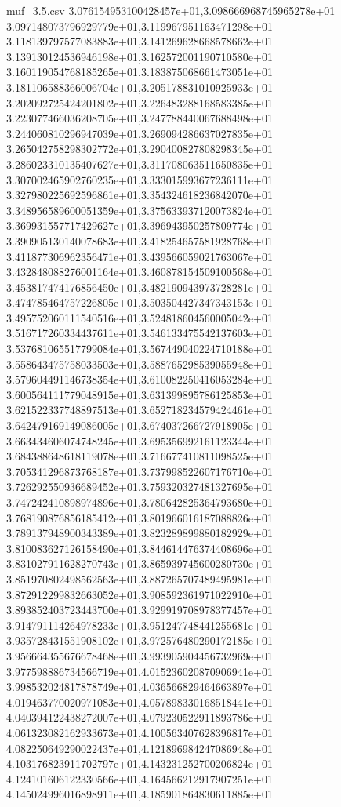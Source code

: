 \begin{filecontents*}{muf_3.5.csv}
3.076154953100428457e+01,3.098666968745965278e+01
3.097148073796929779e+01,3.119967951163471298e+01
3.118139797577083883e+01,3.141269628668578662e+01
3.139130124536946198e+01,3.162572001190710580e+01
3.160119054768185265e+01,3.183875068661473051e+01
3.181106588366006704e+01,3.205178831010925933e+01
3.202092725424201802e+01,3.226483288168583385e+01
3.223077466036208705e+01,3.247788440067688498e+01
3.244060810296947039e+01,3.269094286637027835e+01
3.265042758298302772e+01,3.290400827808298345e+01
3.286023310135407627e+01,3.311708063511650835e+01
3.307002465902760235e+01,3.333015993677236111e+01
3.327980225692596861e+01,3.354324618236842070e+01
3.348956589600051359e+01,3.375633937120073824e+01
3.369931557717429627e+01,3.396943950257809774e+01
3.390905130140078683e+01,3.418254657581928768e+01
3.411877306962356471e+01,3.439566059021763067e+01
3.432848088276001164e+01,3.460878154509100568e+01
3.453817474176856450e+01,3.482190943973728281e+01
3.474785464757226805e+01,3.503504427347343153e+01
3.495752060111540516e+01,3.524818604560005042e+01
3.516717260334437611e+01,3.546133475542137603e+01
3.537681065517799084e+01,3.567449040224710188e+01
3.558643475758033503e+01,3.588765298539055948e+01
3.579604491146738354e+01,3.610082250416053284e+01
3.600564111779048915e+01,3.631399895786125853e+01
3.621522337748897513e+01,3.652718234579424461e+01
3.642479169149086005e+01,3.674037266727918905e+01
3.663434606074748245e+01,3.695356992161123344e+01
3.684388648618119078e+01,3.716677410811098525e+01
3.705341296873768187e+01,3.737998522607176710e+01
3.726292550936689452e+01,3.759320327481327695e+01
3.747242410898974896e+01,3.780642825364793680e+01
3.768190876856185412e+01,3.801966016187088826e+01
3.789137948900343389e+01,3.823289899880182929e+01
3.810083627126158490e+01,3.844614476374408696e+01
3.831027911628270743e+01,3.865939745600280730e+01
3.851970802498562563e+01,3.887265707489495981e+01
3.872912299832663052e+01,3.908592361971022910e+01
3.893852403723443700e+01,3.929919708978377457e+01
3.914791114264978233e+01,3.951247748441255681e+01
3.935728431551908102e+01,3.972576480290172185e+01
3.956664355676678468e+01,3.993905904456732969e+01
3.977598886734566719e+01,4.015236020870906941e+01
3.998532024817878749e+01,4.036566829464663897e+01
4.019463770020971083e+01,4.057898330168518441e+01
4.040394122438272007e+01,4.079230522911893786e+01
4.061323082162933673e+01,4.100563407628396817e+01
4.082250649290022437e+01,4.121896984247086948e+01
4.103176823911702797e+01,4.143231252700206824e+01
4.124101606122330566e+01,4.164566212917907251e+01
4.145024996016898911e+01,4.185901864830611885e+01

\end{filecontents*}
